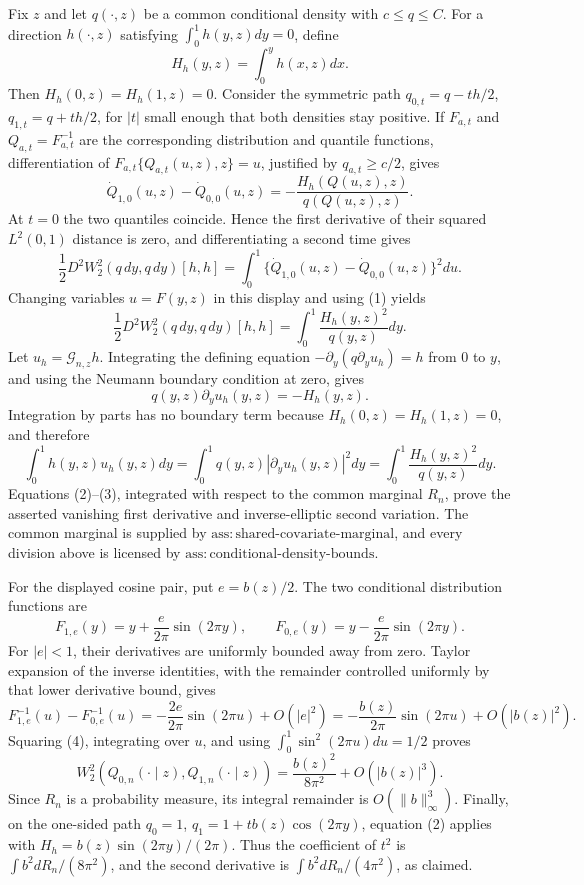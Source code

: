 Fix \(z\) and let \(q(\cdot,z)\) be a common conditional density with \(c\le q\le C\).  For a direction \(h(\cdot,z)\) satisfying \(\int_0^1h(y,z)dy=0\), define
\[
H_h(y,z)=\int_0^y h(x,z)dx .
\]
Then \(H_h(0,z)=H_h(1,z)=0\).  Consider the symmetric path \(q_{0,t}=q-th/2\), \(q_{1,t}=q+th/2\), for \(|t|\) small enough that both densities stay positive.  If \(F_{a,t}\) and \(Q_{a,t}=F_{a,t}^{-1}\) are the corresponding distribution and quantile functions, differentiation of \(F_{a,t}\{Q_{a,t}(u,z),z\}=u\), justified by \(q_{a,t}\ge c/2\), gives
\[
\dot Q_{1,0}(u,z)-\dot Q_{0,0}(u,z)
=-\frac{H_h(Q(u,z),z)}{q(Q(u,z),z)}.                                      \tag{1}
\]
At \(t=0\) the two quantiles coincide.  Hence the first derivative of their squared \(L^2(0,1)\) distance is zero, and differentiating a second time gives
\[
\frac12D^2W_2^2(q\,dy,q\,dy)[h,h]
=\int_0^1\{\dot Q_{1,0}(u,z)-\dot Q_{0,0}(u,z)\}^2du.
\]
Changing variables \(u=F(y,z)\) in this display and using (1) yields
\[
\frac12D^2W_2^2(q\,dy,q\,dy)[h,h]
=\int_0^1\frac{H_h(y,z)^2}{q(y,z)}dy.                                      \tag{2}
\]
Let \(u_h=\mathcal G_{n,z}h\).  Integrating the defining equation
\(-\partial_y(q\partial_yu_h)=h\) from \(0\) to \(y\), and using the Neumann boundary condition at zero, gives
\[
q(y,z)\partial_yu_h(y,z)=-H_h(y,z).
\]
Integration by parts has no boundary term because \(H_h(0,z)=H_h(1,z)=0\), and therefore
\[
\int_0^1h(y,z)u_h(y,z)dy
=\int_0^1q(y,z)|\partial_yu_h(y,z)|^2dy
=\int_0^1\frac{H_h(y,z)^2}{q(y,z)}dy.                                      \tag{3}
\]
Equations (2)--(3), integrated with respect to the common marginal \(R_n\), prove the asserted vanishing first derivative and inverse-elliptic second variation.  The common marginal is supplied by \(\mathrm{ass{:}shared\text{-}covariate\text{-}marginal}\), and every division above is licensed by \(\mathrm{ass{:}conditional\text{-}density\text{-}bounds}\).

For the displayed cosine pair, put \(e=b(z)/2\).  The two conditional distribution functions are
\[
F_{1,e}(y)=y+\frac{e}{2\pi}\sin(2\pi y),\qquad
F_{0,e}(y)=y-\frac{e}{2\pi}\sin(2\pi y).
\]
For \(|e|<1\), their derivatives are uniformly bounded away from zero.  Taylor expansion of the inverse identities, with the remainder controlled uniformly by that lower derivative bound, gives
\[
F_{1,e}^{-1}(u)-F_{0,e}^{-1}(u)
=-\frac{2e}{2\pi}\sin(2\pi u)+O(|e|^2)
=-\frac{b(z)}{2\pi}\sin(2\pi u)+O(|b(z)|^2).                              \tag{4}
\]
Squaring (4), integrating over \(u\), and using \(\int_0^1\sin^2(2\pi u)du=1/2\) proves
\[
W_2^2(Q_{0,n}(\cdot\mid z),Q_{1,n}(\cdot\mid z))
=\frac{b(z)^2}{8\pi^2}+O(|b(z)|^3).                                        \tag{5}
\]
Since \(R_n\) is a probability measure, its integral remainder is \(O(\|b\|_\infty^3)\).  Finally, on the one-sided path \(q_0=1\), \(q_1=1+t b(z)\cos(2\pi y)\), equation (2) applies with \(H_h=b(z)\sin(2\pi y)/(2\pi)\).  Thus the coefficient of \(t^2\) is \(\int b^2dR_n/(8\pi^2)\), and the second derivative is \(\int b^2dR_n/(4\pi^2)\), as claimed.